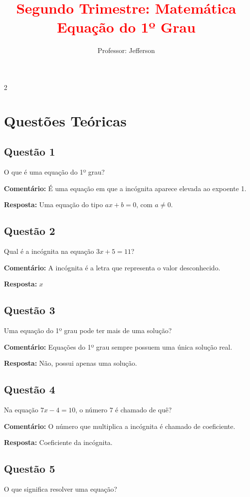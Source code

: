 \documentclass[11pt]{article}
\title{\textcolor{red}{Segundo Trimestre: Matemática
\\Equação do 1º Grau}}
\author{Professor: Jefferson}
\date{}
\begin{document}
\maketitle
\vspace{-1cm}

\begin{multicols}{2}

\section*{Questões Teóricas}

\subsection*{Questão 1}
O que é uma equação do 1º grau?

\textbf{Comentário:}  
É uma equação em que a incógnita aparece elevada ao expoente 1.

\textbf{Resposta:} Uma equação do tipo $ax + b = 0$, com $a \neq 0$.

\subsection*{Questão 2}
Qual é a incógnita na equação $3x + 5 = 11$?

\textbf{Comentário:}  
A incógnita é a letra que representa o valor desconhecido.

\textbf{Resposta:} $x$

\subsection*{Questão 3}
Uma equação do 1º grau pode ter mais de uma solução?

\textbf{Comentário:}  
Equações do 1º grau sempre possuem uma única solução real.

\textbf{Resposta:} Não, possui apenas uma solução.

\subsection*{Questão 4}
Na equação $7x - 4 = 10$, o número $7$ é chamado de quê?

\textbf{Comentário:}  
O número que multiplica a incógnita é chamado de coeficiente.

\textbf{Resposta:} Coeficiente da incógnita.

\subsection*{Questão 5}
O que significa resolver uma equação?


\end{multicols}
\end{document}
